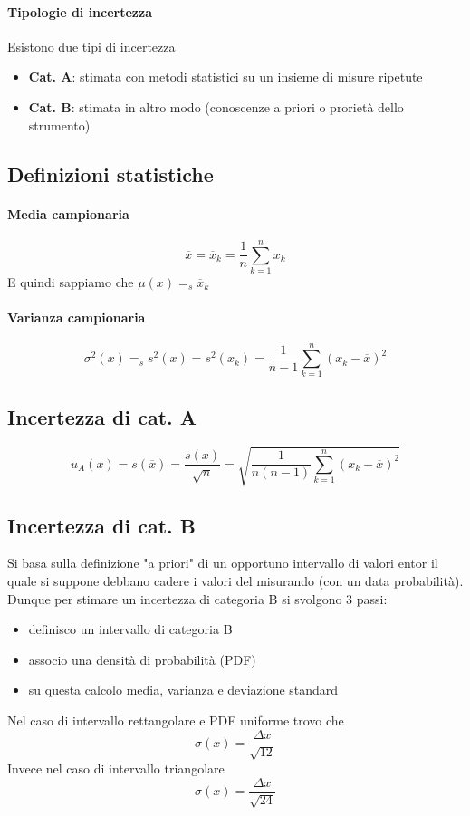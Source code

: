 \documentclass{article}
\begin{document}
	\paragraph*{Tipologie di incertezza}
	Esistono due tipi di incertezza
	\begin{itemize}
		\item \textbf{Cat. A}: stimata con metodi statistici su un insieme di misure ripetute
		\item \textbf{Cat. B}: stimata in altro modo (conoscenze a priori o prorietà dello strumento)
	\end{itemize}
	\subsection*{Definizioni statistiche}
	\paragraph*{Media campionaria}
	\begin{equation}
		\overline{x} = \overline{x}_k = \frac{1}{n} \sum_{k=1}^{n} x_k
	\end{equation}
	E quindi sappiamo che $\mu(x) =_s \overline{x}_k$
	\paragraph*{Varianza campionaria}
	\begin{equation}
		\sigma^2(x) =_s s^2(x) = s^2(x_k) = \frac{1}{n-1}\sum_{k=1}^n(x_k-\overline{x})^2
	\end{equation}
	\subsection*{Incertezza di cat. A}
	\begin{equation}
		u_A(x) = s(\overline{x}) = \frac{s(x)}{\sqrt{n}}=\sqrt{\frac{1}{n(n-1)} \sum_{k=1}^n(x_k-\overline{x})^2}
	\end{equation}
	\subsection*{Incertezza di cat. B}
	Si basa sulla definizione "a priori" di un opportuno intervallo di valori entor il quale si suppone debbano cadere i valori del misurando (con un data probabilità).\\
	Dunque per stimare un incertezza di categoria B si svolgono 3 passi:
	\begin{itemize}
		\item definisco un intervallo di categoria B
		\item associo una densità di probabilità (PDF)
		\item su questa calcolo media, varianza e deviazione standard
	\end{itemize}
	Nel caso di intervallo rettangolare e PDF uniforme trovo che
	\begin{equation}
	\sigma(x) = \frac{\Delta x}{\sqrt{12}}
	\end{equation}
	Invece nel caso di intervallo triangolare
	\begin{equation}
	\sigma(x) = \frac{\Delta x}{\sqrt{24}}
	\end{equation}
\end{document}
